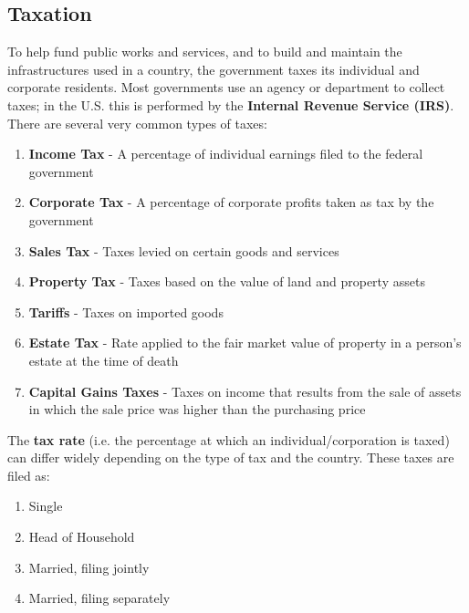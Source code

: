 \documentclass{article}
\begin{document}
  \subsection{Taxation}

    \begin{definition}[Taxes]
      To help fund public works and services, and to build and maintain the infrastructures used in a country, the government taxes its individual and corporate residents. Most governments use an agency or department to collect taxes; in the U.S. this is performed by the \textbf{Internal Revenue Service (IRS)}. There are several very common types of taxes: 
      \begin{enumerate}
        \item \textbf{Income Tax} - A percentage of individual earnings filed to the federal government
        \item \textbf{Corporate Tax} - A percentage of corporate profits taken as tax by the government
        \item \textbf{Sales Tax} - Taxes levied on certain goods and services
        \item \textbf{Property Tax} - Taxes based on the value of land and property assets
        \item \textbf{Tariffs} - Taxes on imported goods
        \item \textbf{Estate Tax} - Rate applied to the fair market value of property in a person's estate at the time of death
        \item \textbf{Capital Gains Taxes} - Taxes on income that results from the sale of assets in which the sale price was higher than the purchasing price 
      \end{enumerate}
      The \textbf{tax rate} (i.e. the percentage at which an individual/corporation is taxed) can differ widely depending on the type of tax and the country. These taxes are filed as: 
      \begin{enumerate}
        \item Single
        \item Head of Household
        \item Married, filing jointly
        \item Married, filing separately 
      \end{enumerate}
    \end{definition}
\end{document}
